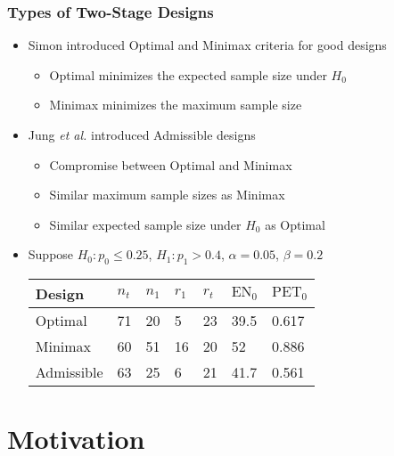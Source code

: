 \documentclass{beamer}\usepackage[]{graphicx}\usepackage[]{color}
\begin{document}
\begin{frame}
\frametitle{Types of Two-Stage Designs}
    \begin{itemize}
        \item Simon introduced Optimal and Minimax criteria for good designs
          \begin{itemize}
             \item Optimal minimizes the expected sample size under $H_0$
             \item Minimax minimizes the maximum sample size 
          \end{itemize}
        \item Jung \textit{et al.} introduced Admissible designs
            \begin{itemize}
              \item Compromise between Optimal and Minimax
              \item Similar maximum sample sizes as Minimax
              \item Similar expected sample size under $H_0$ as Optimal
            \end{itemize}
        \item Suppose $H_0: p_0 \leq 0.25$, $H_1: p_1 > 0.4$, $\alpha = 0.05$, $\beta = 0.2$

\begin{table}[]
\centering
\begin{tabular}{l|llllll}
Design     & $n_t$ & $n_1$ & $r_1$ & $r_t$ & $\mbox{EN}_0$    & $\mbox{PET}_0$ \\ \hline
Optimal    & 71      &  20     &   5    &   23    &      39.5      &    0.617            \\
Minimax    &  60     &  51     &   16    &   20    &    52          &      0.886          \\
Admissible &  63     &   25    &   6    &   21    &     41.7     &     0.561          
\end{tabular}
\end{table}
    \end{itemize}
\end{frame}


\section{Motivation}
\end{document}
